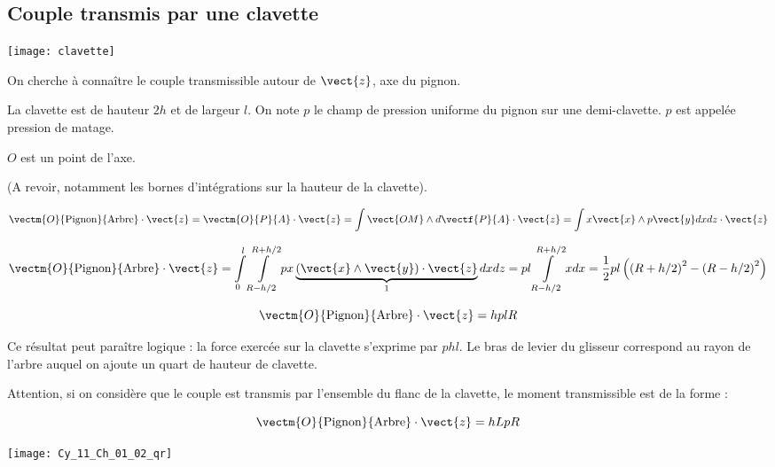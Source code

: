 
\subsection*{Couple transmis par une clavette}


\begin{marginfigure}
\begin{center}
\texttt{[image: clavette]}
\end{center}

\end{marginfigure}
On cherche à connaître le couple transmissible autour de $\vect{z}$, axe du pignon.

La clavette est de hauteur $2h$ et de largeur $l$. On note $p$ le champ de pression uniforme du pignon sur une demi-clavette. $p$ est appelée pression de matage. 

$O$ est un point de l'axe.



\ifprof
(A revoir, notamment les bornes d'intégrations sur la hauteur de la clavette).


$$
\vectm{O}{\text{Pignon}}{\text{Arbre}} \cdot \vect{z} = 
\vectm{O}{P}{A} \cdot \vect{z} 
= \int \vect{OM}\wedge d\vectf{P}{A} \cdot \vect{z}
= \int x\vect{x} \wedge p \vect{y}  dx dz \cdot \vect{z}
$$

$$
\vectm{O}{\text{Pignon}}{\text{Arbre}} \cdot \vect{z} 
= \int\limits_{0}^{l}\int\limits_{R-h/2}^{R+h/2} px\underbrace{\left( \vect{x} \wedge  \vect{y}\right)\cdot \vect{z}}_1  dx dz 
= pl\int\limits_{R-h/2}^{R+h/2} x  dx =\dfrac{1}{2}pl\left(\left(R+h/2 \right)^2-\left( R-h/2\right)^2 \right)
$$


$$
\vectm{O}{\text{Pignon}}{\text{Arbre}} \cdot \vect{z} 
=hplR
$$

Ce résultat peut paraître logique : la force exercée sur la clavette s'exprime par $phl$. Le bras de levier du glisseur correspond au rayon de l'arbre auquel on ajoute un quart de hauteur de clavette.


Attention, si on considère que le couple est transmis par l'ensemble du flanc de la clavette, le moment transmissible est de la forme : 

$$
\vectm{O}{\text{Pignon}}{\text{Arbre}} \cdot \vect{z} 
=hLpR
$$
\else
\fi

\ifprof
\else
\begin{marginfigure}
\centering
\texttt{[image: Cy\_11\_Ch\_01\_02\_qr]}
\end{marginfigure}
\fi